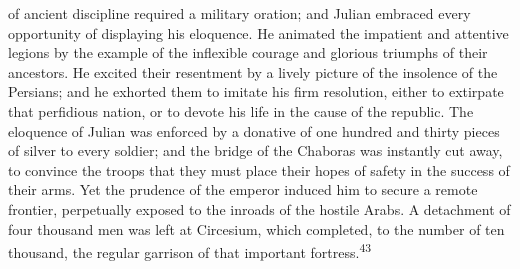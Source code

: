 of ancient discipline required a military oration; and Julian
embraced every opportunity of displaying his eloquence. He
animated the impatient and attentive legions by the example of
the inflexible courage and glorious triumphs of their ancestors.
He excited their resentment by a lively picture of the insolence
of the Persians; and he exhorted them to imitate his firm
resolution, either to extirpate that perfidious nation, or to
devote his life in the cause of the republic. The eloquence of
Julian was enforced by a donative of one hundred and thirty
pieces of silver to every soldier; and the bridge of the Chaboras
was instantly cut away, to convince the troops that they must
place their hopes of safety in the success of their arms. Yet the
prudence of the emperor induced him to secure a remote frontier,
perpetually exposed to the inroads of the hostile Arabs. A
detachment of four thousand men was left at Circesium, which
completed, to the number of ten thousand, the regular garrison of
that important fortress.\textsuperscript{43}





